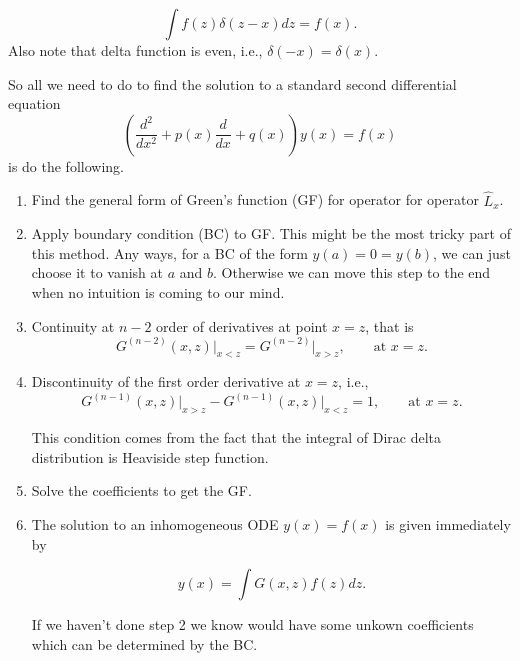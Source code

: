 \documentclass{tufte-handout}
\begin{document}
\begin{framed}
\begin{equation*}
    \int f(z) \delta(z-x) dz = f(x).
\end{equation*}
Also note that delta function is even, i.e., $\delta(-x) = \delta(x)$.

So all we need to do to find the solution to a standard second differential equation
\begin{equation*}
    \left( \frac{d^2}{dx^2} + p(x) \frac{d}{dx} + q(x) \right)y(x) = f(x)
\end{equation*}
is do the following.

\begin{enumerate}
\item 
    Find the general form of Green's function (GF) for operator for operator $\hat L_x$.
\item
Apply boundary condition (BC) to GF. This might be the most tricky part of this method. Any ways, for a BC of the form $y(a)=0=y(b)$, we can just choose it to vanish at $a$ and $b$. Otherwise we can move this step to the end when no intuition is coming to our mind.
\item 
Continuity at $n-2$ order of derivatives at point $x=z$, that is
\begin{equation*}
    G^{(n-2)}(x,z) \vert_{x<z} = G^{(n-2)} \vert _{x>z} ,\qquad \text{at } x= z.
\end{equation*}
    
    
\item
Discontinuity of the first order derivative at $x=z$, i.e., 
\begin{equation*}
    G^{(n-1)}(x,z)\vert_{x>z} - G^{(n-1)}(x,z)\vert_{x<z} = 1, \qquad \text{at } x= z.
\end{equation*}

This condition comes from the fact that the integral of Dirac delta distribution is Heaviside step function.

\item
Solve the coefficients to get the GF.

\item
The solution to an inhomogeneous ODE  $y(x)=f(x)$ is given immediately by

\begin{equation*}
    y(x) = \int G(x,z) f(z) dz.
\end{equation*}

If we haven't done step 2 we know would have some unkown coefficients which can be determined by the BC.

\end{enumerate}


\end{framed}
\end{document}
